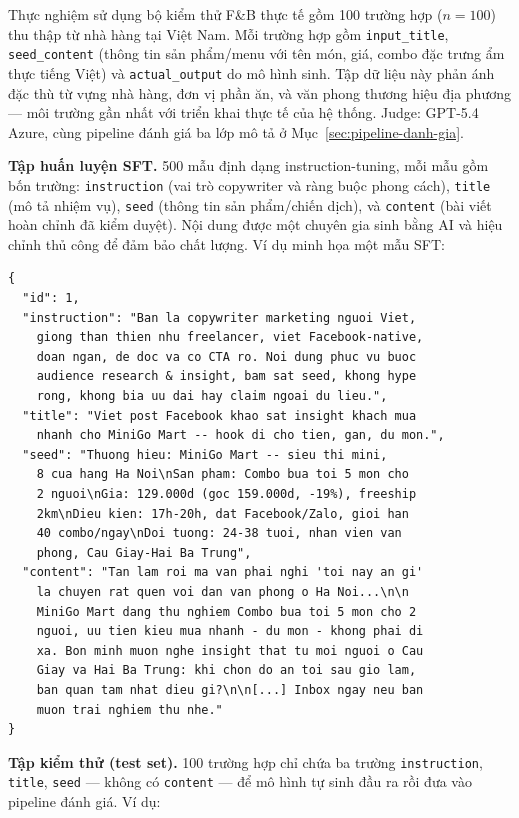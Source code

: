 Thực nghiệm sử dụng bộ kiểm thử F\&B thực tế gồm 100 trường hợp
($n = 100$) thu thập từ nhà hàng tại Việt Nam. Mỗi
trường hợp gồm \texttt{input\_title}, \texttt{seed\_content} (thông tin
sản phẩm/menu với tên món, giá, combo đặc trưng ẩm thực tiếng Việt) và
\texttt{actual\_output} do mô hình sinh. Tập dữ liệu này phản ánh đặc
thù từ vựng nhà hàng, đơn vị phần ăn, và văn phong thương hiệu địa
phương --- môi trường gần nhất với triển khai thực tế của hệ thống.
Judge: GPT-5.4 Azure, cùng pipeline đánh giá ba lớp mô tả ở
Mục~\ref{sec:pipeline-danh-gia}.

\textbf{Tập huấn luyện SFT.} 500 mẫu định dạng instruction-tuning, mỗi
mẫu gồm bốn trường: \texttt{instruction} (vai trò copywriter và ràng buộc
phong cách), \texttt{title} (mô tả nhiệm vụ), \texttt{seed} (thông tin
sản phẩm/chiến dịch), và \texttt{content} (bài viết hoàn chỉnh đã kiểm
duyệt). Nội dung được một chuyên gia sinh bằng AI và hiệu chỉnh thủ công
để đảm bảo chất lượng. Ví dụ minh họa một mẫu SFT:

\begin{lstlisting}[language={},basicstyle=\scriptsize\ttfamily,
  breaklines=true,frame=single,numbers=none,
  caption={Ví dụ mẫu trong tập huấn luyện SFT (rút gọn).}]
{
  "id": 1,
  "instruction": "Ban la copywriter marketing nguoi Viet,
    giong than thien nhu freelancer, viet Facebook-native,
    doan ngan, de doc va co CTA ro. Noi dung phuc vu buoc
    audience research & insight, bam sat seed, khong hype
    rong, khong bia uu dai hay claim ngoai du lieu.",
  "title": "Viet post Facebook khao sat insight khach mua
    nhanh cho MiniGo Mart -- hook di cho tien, gan, du mon.",
  "seed": "Thuong hieu: MiniGo Mart -- sieu thi mini,
    8 cua hang Ha Noi\nSan pham: Combo bua toi 5 mon cho
    2 nguoi\nGia: 129.000d (goc 159.000d, -19%), freeship
    2km\nDieu kien: 17h-20h, dat Facebook/Zalo, gioi han
    40 combo/ngay\nDoi tuong: 24-38 tuoi, nhan vien van
    phong, Cau Giay-Hai Ba Trung",
  "content": "Tan lam roi ma van phai nghi 'toi nay an gi'
    la chuyen rat quen voi dan van phong o Ha Noi...\n\n
    MiniGo Mart dang thu nghiem Combo bua toi 5 mon cho 2
    nguoi, uu tien kieu mua nhanh - du mon - khong phai di
    xa. Bon minh muon nghe insight that tu moi nguoi o Cau
    Giay va Hai Ba Trung: khi chon do an toi sau gio lam,
    ban quan tam nhat dieu gi?\n\n[...] Inbox ngay neu ban
    muon trai nghiem thu nhe."
}
\end{lstlisting}

\textbf{Tập kiểm thử (test set).} 100 trường hợp chỉ chứa ba trường
\texttt{instruction}, \texttt{title}, \texttt{seed} --- không có
\texttt{content} --- để mô hình tự sinh đầu ra rồi đưa vào pipeline
đánh giá. Ví dụ:

